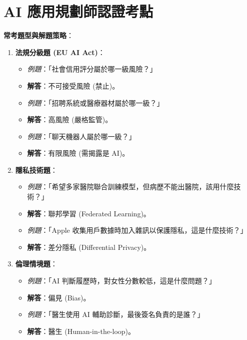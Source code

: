 \documentclass[
  letterpaper,
  DIV=11,
  numbers=noendperiod]{scrreprt}
\providecommand{\tightlist}{%
  \setlength{\itemsep}{0pt}\setlength{\parskip}{0pt}}
\begin{document}
\section{AI
應用規劃師認證考點}\label{ai-ux61c9ux7528ux898fux5283ux5e2bux8a8dux8b49ux8003ux9ede-10}

\textbf{常考題型與解題策略}：

\begin{enumerate}
\def\labelenumi{\arabic{enumi}.}
\tightlist
\item
  \textbf{法規分級題 (EU AI Act)}：

  \begin{itemize}
  \tightlist
  \item
    \emph{例題}：「社會信用評分屬於哪一級風險？」
  \item
    \textbf{解答}：不可接受風險 (禁止)。
  \item
    \emph{例題}：「招聘系統或醫療器材屬於哪一級？」
  \item
    \textbf{解答}：高風險 (嚴格監管)。
  \item
    \emph{例題}：「聊天機器人屬於哪一級？」
  \item
    \textbf{解答}：有限風險 (需揭露是 AI)。
  \end{itemize}
\item
  \textbf{隱私技術題}：

  \begin{itemize}
  \tightlist
  \item
    \emph{例題}：「希望多家醫院聯合訓練模型，但病歷不能出醫院，該用什麼技術？」
  \item
    \textbf{解答}：聯邦學習 (Federated Learning)。
  \item
    \emph{例題}：「Apple
    收集用戶數據時加入雜訊以保護隱私，這是什麼技術？」
  \item
    \textbf{解答}：差分隱私 (Differential Privacy)。
  \end{itemize}
\item
  \textbf{倫理情境題}：

  \begin{itemize}
  \tightlist
  \item
    \emph{例題}：「AI 判斷履歷時，對女性分數較低，這是什麼問題？」
  \item
    \textbf{解答}：偏見 (Bias)。
  \item
    \emph{例題}：「醫生使用 AI 輔助診斷，最後簽名負責的是誰？」
  \item
    \textbf{解答}：醫生 (Human-in-the-loop)。
  \end{itemize}
\end{enumerate}
\end{document}
